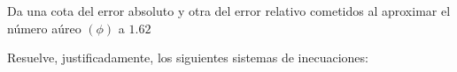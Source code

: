 \documentclass[addpoints,spanish, 12pt,a4paper]{exam}
\renewcommand*\half{.5}
\begin{document}
\begin{questions}


\question[1] Da una cota del error absoluto y otra del error relativo cometidos al aproximar el número aúreo $\left(\phi\right)$ a $1.62$

        \question[3] Resuelve, justificadamente, los siguientes sistemas de inecuaciones:
        \begin{multicols}{2}
        \begin{parts} 

\end{parts}
\end{multicols}
\end{questions}
\end{document}
